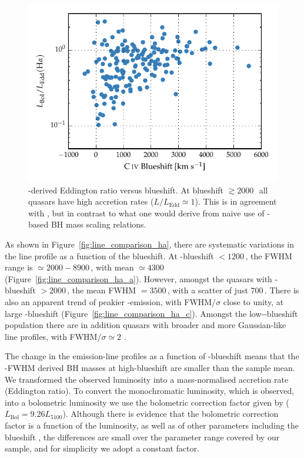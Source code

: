 \begin{figure}
    \centering
    \includegraphics[width=0.8\linewidth]{figures/chapter03/ha_edd_civ_bs.pdf}
    \caption[{\hans-derived Eddington ratio versus  blueshift.}]{\hans-derived Eddington ratio versus  blueshift. At blueshift $\gtrsim2000$\,\kms\, all quasars have high accretion rates ($L/L_{\text{Edd}} \simeq 1$). This is in agreement with \citet{kratzer15}, but in contrast to what one would derive from naive use of -based BH mass scaling relations.}
    \label{fig:ha_edd_civ_bs}
\end{figure}

As shown in Figure~\ref{fig:line_comparison_ha}, there are systematic variations in the \ha line profile as a function of the  blueshift.
At -blueshift $<1200$\,\kms, the \ha FWHM range is $\simeq2000 - 8900$\,\kms, with mean $\simeq4300$\,\kms\, (Figure~\ref{fig:line_comparison_ha_a}).
However, amongst the quasars with -blueshift $>2000$\,\kms, the mean \ha FWHM $=3500$\,\kms, with a scatter of just $700$\,\kms.
There is also an apparent trend of peakier \hans-emission, with FWHM/$\sigma$ close to unity, at large -blueshift (Figure~\ref{fig:line_comparison_ha_c}).
Amongst the low--blueshift population there are in addition quasars with broader and more Gaussian-like \ha line profiles, with FWHM/$\sigma \simeq 2$ .

The change in the \ha emission-line profiles as a function of -blueshift means that the \hans-FWHM derived BH masses at high-blueshift are smaller than the sample mean.
We transformed the observed luminosity into a mass-normalised accretion rate (Eddington ratio).
To convert the monochromatic luminosity, which is observed, into a bolometric luminosity we use the bolometric correction factor given by \citet{richards06} ($L_{\text{Bol}} = 9.26L_{5100}$).
Although there is evidence that the bolometric correction factor is a function of the luminosity, as well as of other parameters including the  blueshift \citep{krawczyk13}, the differences are small over the parameter range covered by our sample, and for simplicity we adopt a constant factor.


